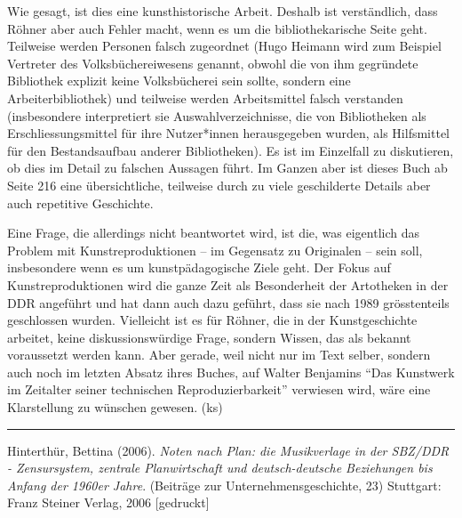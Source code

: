 \documentclass[a4paper,
fontsize=11pt,
oneside,
numbers=noperiodatend,
parskip=half-,
bibliography=totoc,
final
]{scrartcl}
\begin{document}
Wie gesagt, ist dies eine kunsthistorische Arbeit. Deshalb ist
verständlich, dass Röhner aber auch Fehler macht, wenn es um die
bibliothekarische Seite geht. Teilweise werden Personen falsch
zugeordnet (Hugo Heimann wird zum Beispiel Vertreter des
Volksbüchereiwesens genannt, obwohl die von ihm gegründete Bibliothek
explizit keine Volksbücherei sein sollte, sondern eine
Arbeiterbibliothek) und teilweise werden Arbeitsmittel falsch verstanden
(insbesondere interpretiert sie Auswahlverzeichnisse, die von
Bibliotheken als Erschliessungsmittel für ihre Nutzer*innen
herausgegeben wurden, als Hilfsmittel für den Bestandsaufbau anderer
Bibliotheken). Es ist im Einzelfall zu diskutieren, ob dies im Detail zu
falschen Aussagen führt. Im Ganzen aber ist dieses Buch ab Seite 216
eine übersichtliche, teilweise durch zu viele geschilderte Details aber
auch repetitive Geschichte.

Eine Frage, die allerdings nicht beantwortet wird, ist die, was
eigentlich das Problem mit Kunstreproduktionen – im Gegensatz zu
Originalen – sein soll, insbesondere wenn es um kunstpädagogische Ziele
geht. Der Fokus auf Kunstreproduktionen wird die ganze Zeit als
Besonderheit der Artotheken in der DDR angeführt und hat dann auch dazu
geführt, dass sie nach 1989 grösstenteils geschlossen wurden. Vielleicht
ist es für Röhner, die in der Kunstgeschichte arbeitet, keine
diskussionswürdige Frage, sondern Wissen, das als bekannt voraussetzt
werden kann. Aber gerade, weil nicht nur im Text selber, sondern auch
noch im letzten Absatz ihres Buches, auf Walter Benjamins \enquote{Das
Kunstwerk im Zeitalter seiner technischen Reproduzierbarkeit} verwiesen
wird, wäre eine Klarstellung zu wünschen gewesen. (ks)

\begin{center}\rule{0.5\linewidth}{0.5pt}\end{center}

Hinterthür, Bettina (2006). \emph{Noten nach Plan: die Musikverlage in
der SBZ/DDR - Zensursystem, zentrale Planwirtschaft und deutsch-deutsche
Beziehungen bis Anfang der 1960er Jahre}. (Beiträge zur
Unternehmensgeschichte, 23) Stuttgart: Franz Steiner Verlag, 2006
{[}gedruckt{]}
\end{document}

